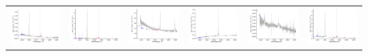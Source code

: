 \begin{center}
\begin{longtable}{l l l l l l }
    \includegraphics[width=0.3\linewidth, clip]{Figs/Figs-sdss/spec-0289-51990-0202-SPLUS-n02s28-039352.pdf} & \includegraphics[width=0.3\linewidth, clip]{Figs/Figs-sdss/spec-0289-51990-0210-SPLUS-n02s27-030322.pdf} & \includegraphics[width=0.3\linewidth, clip]{Figs/Figs-sdss/spec-0289-51990-0234-SPLUS-n01s27-014192.pdf} & \includegraphics[width=0.3\linewidth, clip]{Figs/Figs-sdss/spec-0289-51990-0542-SPLUS-n01s28-027608.pdf} & \includegraphics[width=0.3\linewidth, clip]{Figs/Figs-sdss/spec-0327-52294-0620-SPLUS-n02s19-022704.pdf} & \includegraphics[width=0.3\linewidth, clip]{Figs/Figs-sdss/spec-0329-52056-0529-SPLUS-n02s20-017833.pdf} \\

\end{longtable}
\end{center}
